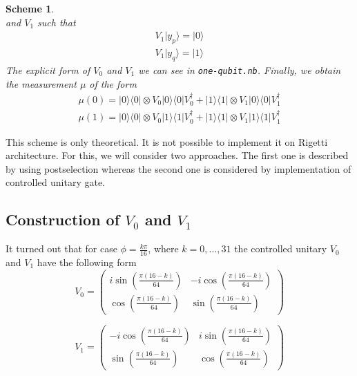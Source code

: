 \documentclass[11pt,a4paper,reqno, oneside]{amsart}
\newcommand{\ket}[1]{\ensuremath{|#1\rangle}}
\newcommand{\bra}[1]{\ensuremath{\langle#1|}}
\newcommand{\ketbra}[2]{\ensuremath{\ket{#1} \! \bra{#2}}}
\newcommand{\proj}[1]{\ensuremath{\ketbra{#1}{#1}}}
\newcommand{\1}{{\rm 1\hspace{-0.9mm}l}}
\newtheorem{scheme}{Scheme}
\begin{document}
\begin{scheme}
\begin{equation}
	\end{equation}
	and $V_1$ such that
	\begin{equation}
	\begin{split}
	V_1 \ket{y_p} = \ket{0} \\ 
	V_1 \ket{y_q} = \ket{1}
	\end{split}
	\end{equation}
	The explicit form of $V_0$ and $V_1$ we can see in \texttt{one-qubit.nb}.
	Finally, we obtain the measurement $\mu$ of the form
	\begin{equation}
	\begin{split}
	 \mu(0) = \proj{0} \otimes V_0 \proj{0} V_0^\dagger +  \proj{1} \otimes V_1 
	 \proj{0} V_1^\dagger  \\ 
	\mu(1) = \proj{0} \otimes V_0 \proj{1} V_0^\dagger +  \proj{1} \otimes V_1 
	\proj{1} V_1^\dagger  
	\end{split}
	\end{equation}
\end{scheme}
This scheme is only theoretical. It is not possible to implement it on Rigetti 
architecture. For this, we will consider two approaches. The first one is 
described 
by using postselection whereas the second one is considered by implementation 
of controlled unitary gate. 

\subsection{Construction of $V_0$ and $V_1$}
	It turned out that for case $\phi = \frac{k \pi}{16}$, where $k=0,\ldots,31$ the controlled unitary $V_0$ and $V_1$ have the following form
	\begin{equation}
	V_0 = \left(\begin{array}{cc}i \sin\left( \frac{\pi(16-k)}{64} \right)&-i \cos\left( \frac{\pi(16-k)}{64} \right)\\ \cos\left( \frac{\pi(16-k)}{64} \right)& \sin\left( \frac{\pi(16-k)}{64} \right)\end{array}\right) 
	\end{equation}
	
		\begin{equation}
	V_1 = \left(\begin{array}{cc}-i \cos\left( \frac{\pi(16-k)}{64} \right) &i \sin\left( \frac{\pi(16-k)}{64} \right)\\\sin\left( \frac{\pi(16-k)}{64} \right) &  \cos\left( \frac{\pi(16-k)}{64} \right) \end{array}\right) 
	\end{equation}
	
\end{document}
